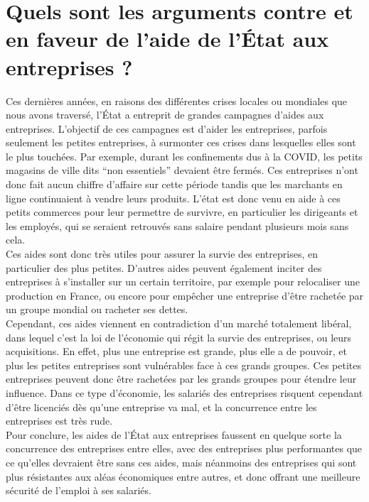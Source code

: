 \documentclass[11pt,a4paper,multicol]{article}
\begin{document}
\section*{Quels sont les arguments contre et en faveur de l'aide de l'État aux entreprises ?}
Ces dernières années, en raisons des différentes crises locales ou mondiales que nous avons traversé, l'État a entreprit de grandes campagnes d'aides aux entreprises. L'objectif de ces campagnes est d'aider les entreprises, parfois seulement les petites entreprises, à surmonter ces crises dans lesquelles elles sont le plus touchées. Par exemple, durant les confinements dus à la COVID, les petits magasins de ville dits ``non essentiels'' devaient être fermés. Ces entreprises n'ont donc fait aucun chiffre d'affaire sur cette période tandis que les marchants en ligne continuaient à vendre leurs produits. L'état est donc venu en aide à ces petits commerces pour leur permettre de survivre, en particulier les dirigeants et les employés, qui se seraient retrouvés sans salaire pendant plusieurs mois sans cela.\\
Ces aides sont donc très utiles pour assurer la survie des entreprises, en particulier des plus petites. D'autres aides peuvent également inciter des entreprises à s'installer sur un certain territoire, par exemple pour relocaliser une production en France, ou encore pour empêcher une entreprise d'être rachetée par un groupe mondial ou racheter ses dettes.\\
Cependant, ces aides viennent en contradiction d'un marché totalement libéral, dans lequel c'est la loi de l'économie qui régit la survie des entreprises, ou leurs acquisitions. En effet, plus une entreprise est grande, plus elle a de pouvoir, et plus les petites entreprises sont vulnérables face à ces grands groupes. Ces petites entreprises peuvent donc être rachetées par les grands groupes pour étendre leur influence. Dans ce type d'économie, les salariés des entreprises risquent cependant d'être licenciés dès qu'une entreprise va mal, et la concurrence entre les entreprises est très rude.\\
Pour conclure, les aides de l'État aux entreprises faussent en quelque sorte la concurrence des entreprises entre elles, avec des entreprises plus performantes que ce qu'elles devraient être sans ces aides, mais néanmoins des entreprises qui sont plus résistantes aux aléas économiques entre autres, et donc offrant une meilleure sécurité de l'emploi à ses salariés.
\end{document}
